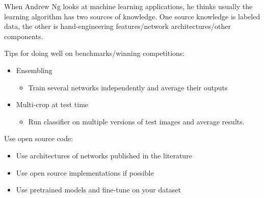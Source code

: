 \documentclass[UTF8]{article}
\begin{document}
When Andrew Ng looks at machine learning applications, he thinks usually the learning algorithm has
two sources of knowledge. One source knowledge is labeled data, the other is hand-engineering
features/network architectures/other components.

Tips for doing well on benchmarks/winning competitions:
\begin{itemize}
    \item Ensembling
    \begin{itemize}
        \item Train several networks independently and average their outputs
    \end{itemize}
    \item Multi-crop at test time
    \begin{itemize}
        \item Run classifier on multiple versions of test images and average results.
    \end{itemize}
\end{itemize}

Use open source code:
\begin{itemize}
    \item Use architectures of networks published in the literature
    \item Use open source implementations if possible
    \item Use pretrained models and fine-tune on your dataset
\end{itemize}
\end{document}
